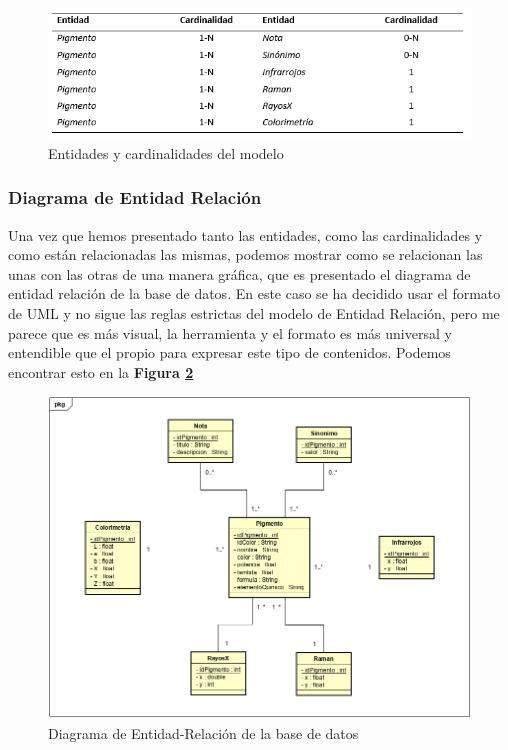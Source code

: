 \begin{figure}[H]
    \centering
    \includegraphics[scale=1]{imagenes/disenoBaseDatos/cardinalidades.png}
    \caption{Entidades y cardinalidades del modelo}
    \label{fig:cardinalidades}
\end{figure}

\subsubsection{Diagrama de Entidad Relación}

Una vez que hemos presentado tanto las entidades, como las cardinalidades y como están relacionadas las mismas, podemos mostrar como se relacionan las unas con las otras de una manera gráfica, que es presentado el diagrama de entidad relación de la base de datos. En este caso se ha decidido usar el formato de UML y no sigue las reglas estrictas del modelo de Entidad Relación, pero me parece que es más visual, la herramienta y el formato es más universal y entendible que el propio para expresar este tipo de contenidos. Podemos encontrar esto en la \textbf{Figura \ref{fig:diagramaER}}

\begin{figure}[H]
    \centering
    \includegraphics[scale=0.75]{imagenes/disenoBaseDatos/diagramaER.png}
    \caption{Diagrama de Entidad-Relación de la base de datos}
    \label{fig:diagramaER}
\end{figure}

